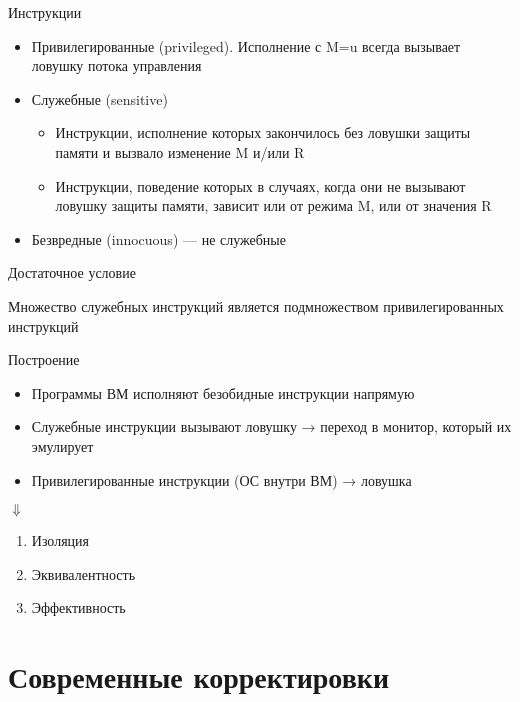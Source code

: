 \documentclass{beamer}
\begin{document}
\begin{frame}{Инструкции}
\begin{itemize}
    \item Привилегированные (privileged). Исполнение с M=u всегда вызывает ловушку потока управления
    \item Служебные (sensitive)
    \begin{itemize}
        \item Инструкции, исполнение которых закончилось без ловушки защиты памяти и вызвало изменение M и/или R
        \item Инструкции, поведение которых в случаях, когда они не вызывают ловушку защиты памяти, зависит или от режима M, или от значения R
    \end{itemize}
    \item Безвредные (innocuous) — не служебные
\end{itemize}
\end{frame}

\begin{frame}[shrink=20]{Достаточное условие}

Множество служебных инструкций является подмножеством привилегированных инструкций

\centering
 
\end{frame}

\begin{frame}{Построение}
\begin{itemize}
    \item Программы ВМ исполняют безобидные инструкции напрямую
    \item Служебные инструкции вызывают ловушку → переход в монитор, который их эмулирует
    \item Привилегированные инструкции (ОС внутри ВМ) → ловушка
\end{itemize}

\centering$\Downarrow$

\begin{enumerate}
    \item Изоляция
    \item Эквивалентность
    \item Эффективность
\end{enumerate}
\end{frame}

\section{Современные корректировки}
\end{document}
